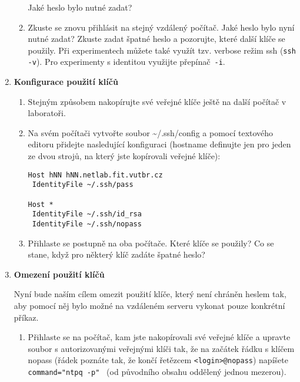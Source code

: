 \begin{enumerate}
\begin{enumerate}
      Jaké heslo bylo nutné zadat?

      \item Zkuste se znovu přihlásit na stejný vzdálený počítač. Jaké heslo bylo nyní nutné zadat? Zkuste
zadat špatné heslo a pozorujte, které další klíče se použily. Při experimentech můžete také
využít tzv. verbose režim ssh ({\tt ssh -v}). Pro experimenty s identitou
využijte přepínač~{\tt -i}.

    \end{enumerate}

  \item {\bf Konfigurace použití klíčů}

    \begin{enumerate}

      \item Stejným způsobem nakopírujte své veřejné klíče ještě na další počítač v laboratoři.

      \item Na svém počítači vytvořte soubor \textasciitilde/.ssh/config a pomocí textového editoru přidejte
nasledující konfiguraci (hostname definujte jen pro jeden ze dvou strojů, na který jste
kopírovali veřejné klíče):
\begin{verbatim}
Host hNN hNN.netlab.fit.vutbr.cz
 IdentityFile ~/.ssh/pass

Host *
 IdentityFile ~/.ssh/id_rsa
 IdentityFile ~/.ssh/nopass
\end{verbatim}
      \item Přihlaste se postupně na oba počítače. Které klíče se použily? Co se stane, když
pro některý klíč zadáte špatné heslo?

    \end{enumerate}

  \item {\bf Omezení použití klíčů}

    Nyní bude naším cílem omezit použití klíče, který není chráněn heslem tak,
    aby pomocí něj bylo možné na vzdáleném serveru vykonat pouze konkrétní příkaz.

    \begin{enumerate}

      \item Přihlaste se na počítač, kam jste nakopírovali své veřejné klíče a
        upravte soubor s autorizovanými veřejnými klíči tak, že na začátek
        řádku s klíčem nopass (řádek poznáte tak, že končí řetězcem
        {\tt <login>@nopass}) napíšete
        \verb|command="ntpq -p" | (od původního
        obsahu oddělený jednou mezerou).


\end{enumerate}
\end{enumerate}
